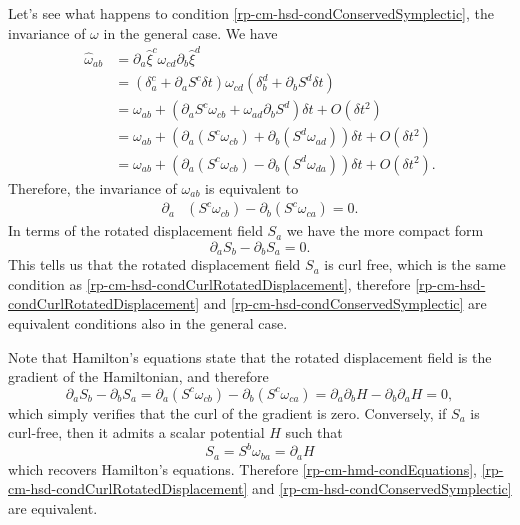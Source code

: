 Let's see what happens to condition \ref{rp-cm-hsd-condConservedSymplectic}, the invariance of $\omega$ in the general case. We have
\begin{equation}
	\begin{aligned}
	\hat{\omega}_{ab} &= \partial_a \hat{\xi}^c \omega_{cd} \partial_b \hat{\xi}^d \\ &= \left(\delta_a^c + \partial_a S^c \delta t\right) \omega_{cd} \left(\delta_b^d + \partial_b S^d \delta t\right) \\
	&= \omega_{ab} + \left(\partial_a S^c \omega_{cb} + \omega_{ad} \partial_b S^d \right) \delta t + O(\delta t^2) \\
	&= \omega_{ab} + \left(\partial_a (S^c \omega_{cb}) + \partial_b ( S^d \omega_{ad}) \right) \delta t + O(\delta t^2) \\
	&= \omega_{ab} + \left(\partial_a (S^c \omega_{cb}) - \partial_b ( S^d \omega_{d a}  ) \right) \delta t + O(\delta t^2).
	\end{aligned}
\end{equation}
Therefore, the invariance of $\omega_{ab}$ is equivalent to
\begin{equation}
	\begin{aligned}
	\partial_a &(S^c \omega_{cb} ) - \partial_b (S^c \omega_{ca} ) = 0.
	\end{aligned}
\end{equation}
In terms of the rotated displacement field $S_a$ we have the more compact form
\begin{equation}
	\partial_a S_b - \partial_b S_a = 0.
\end{equation}
This tells us that the rotated displacement field $S_a$ is curl free, which is the same condition as \ref{rp-cm-hsd-condCurlRotatedDisplacement}, therefore \ref{rp-cm-hsd-condCurlRotatedDisplacement} and \ref{rp-cm-hsd-condConservedSymplectic} are equivalent conditions also in the general case.

Note that Hamilton's equations state that the rotated displacement field is the gradient of the Hamiltonian, and therefore
\begin{equation}
	\partial_a S_b - \partial_b S_a = \partial_a (S^c \omega_{cb}) - \partial_b (S^c \omega_{ca}) =  \partial_a \partial_b H - \partial_b \partial_a H = 0,
\end{equation}
which simply verifies that the curl of the gradient is zero. Conversely, if $S_a$ is curl-free, then it admits a scalar potential $H$ such that
\begin{equation}
	S_a = S^b \omega_{ba} = \partial_a H
\end{equation}
which recovers Hamilton's equations. Therefore \ref{rp-cm-hmd-condEquations}, \ref{rp-cm-hsd-condCurlRotatedDisplacement} and \ref{rp-cm-hsd-condConservedSymplectic} are equivalent.


